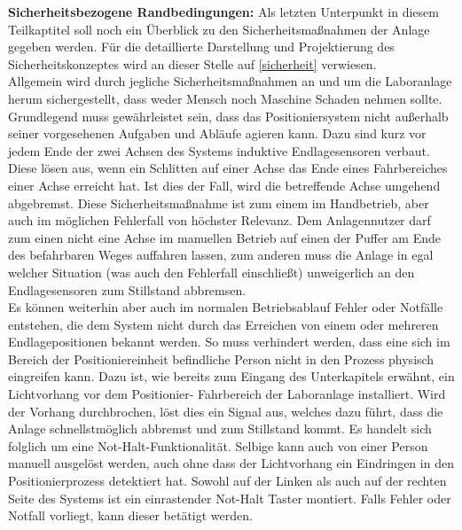 \documentclass[../../../Bachelorarbeit.tex]{subfiles}
\begin{document}
\smallskip
\newline
\textbf{Sicherheitsbezogene Randbedingungen:}
Als letzten Unterpunkt in diesem Teilkaptitel soll noch ein Überblick zu den Sicherheitsmaßnahmen der Anlage gegeben werden. Für die detaillierte Darstellung und Projektierung des Sicherheitskonzeptes wird an dieser Stelle auf \autoref{sicherheit} verwiesen.\\
Allgemein wird durch jegliche Sicherheitsmaßnahmen an und um die Laboranlage herum sichergestellt, dass weder Mensch noch Maschine Schaden nehmen sollte. Grundlegend muss gewährleistet sein, dass das Positioniersystem nicht außerhalb seiner vorgesehenen Aufgaben und Abläufe agieren kann. Dazu sind kurz vor jedem Ende der zwei Achsen des Systems induktive Endlagesensoren verbaut. Diese lösen aus, wenn ein Schlitten auf einer Achse das Ende eines Fahrbereiches einer Achse erreicht hat. Ist dies der Fall, wird die betreffende Achse umgehend abgebremst. Diese Sicherheitsmaßnahme ist zum einem im Handbetrieb, aber auch im möglichen Fehlerfall von höchster Relevanz. Dem Anlagennutzer darf zum einen nicht eine Achse im manuellen Betrieb auf einen der Puffer am Ende des befahrbaren Weges auffahren lassen, zum anderen muss die Anlage in egal welcher Situation (was auch den Fehlerfall einschließt) unweigerlich an den Endlagesensoren zum Stillstand abbremsen.\\
Es können weiterhin aber auch im normalen Betriebsablauf Fehler oder Notfälle entstehen, die dem System nicht durch das Erreichen von einem oder mehreren Endlagepositionen bekannt werden. So muss verhindert werden, dass eine sich im Bereich der Positioniereinheit befindliche Person nicht in den Prozess physisch eingreifen kann. Dazu ist, wie bereits zum Eingang des Unterkapitels erwähnt, ein Lichtvorhang vor dem Positionier- \bzw Fahrbereich der Laboranlage installiert. Wird der Vorhang durchbrochen, löst dies ein Signal aus, welches dazu führt, dass die Anlage schnellstmöglich abbremst und zum Stillstand kommt. Es handelt sich folglich um eine Not-Halt-Funktionalität. Selbige kann auch von einer Person manuell ausgelöst werden, auch ohne dass der Lichtvorhang ein Eindringen in den Positionierprozess detektiert hat. Sowohl auf der Linken als auch auf der rechten Seite des Systems ist ein einrastender Not-Halt Taster montiert. Falls Fehler oder Notfall vorliegt, kann dieser betätigt werden.\\
\end{document}
